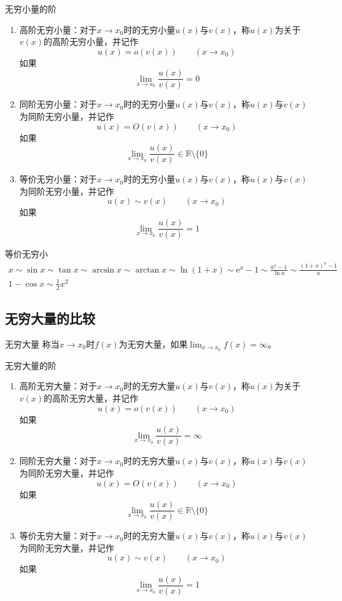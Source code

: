 \documentclass[lang = cn, scheme = chinese, thmcnt = section]{elegantbook}
\newcommand{\R}{\mathbb{R}}            %
\begin{document}
\begin{definition}{无穷小量的阶}
	\begin{enumerate}
		\item 高阶无穷小量：对于$x\to x_0$时的无穷小量$u(x)$与$v(x)$，称$u(x)$为关于$v(x)$的高阶无穷小量，并记作
		$$
		u(x)=o(v(x))\qquad (x\to x_0)
		$$
		如果
		$$
		\lim_{x\to x_0}\frac{u(x)}{v(x)}=0
		$$
		\item 同阶无穷小量：对于$x\to x_0$时的无穷小量$u(x)$与$v(x)$，称$u(x)$与$v(x)$为同阶无穷小量，并记作
		$$
		u(x)=O(v(x))\qquad (x\to x_0)
		$$
		如果
		$$
		\lim_{x\to x_0}\frac{u(x)}{v(x)}\in \R\setminus\{0\}
		$$
		\item 等价无穷小量：对于$x\to x_0$时的无穷小量$u(x)$与$v(x)$，称$u(x)$与$v(x)$为同阶无穷小量，并记作
		$$
		u(x)\sim v(x)\qquad (x\to x_0)
		$$
		如果
		$$
		\lim_{x\to x_0}\frac{u(x)}{v(x)}=1
		$$
	\end{enumerate}
\end{definition}

\begin{theorem}{等价无穷小}
	\begin{gather*}
		x\sim 
		\sin x \sim
		\tan x\sim
		\arcsin x\sim
		\arctan x\sim
		\ln(1+x)\sim
		\mathrm{e}^x-1\sim
		\frac{a^x-1}{\ln a}\sim
		\frac{(1+x)^a-1}{a}\\
		1-\cos x\sim\frac{1}{2}x^2		
	\end{gather*}
\end{theorem}

\subsection{无穷大量的比较}

\begin{definition}{无穷大量}
	称当$x\to x_0$时$f(x)$为无穷大量，如果$\displaystyle \lim_{x\to x_0}f(x)=\infty$。
\end{definition}

\begin{definition}{无穷大量的阶}
	\begin{enumerate}
		\item 高阶无穷大量：对于$x\to x_0$时的无穷大量$u(x)$与$v(x)$，称$u(x)$为关于$v(x)$的高阶无穷大量，并记作
		$$
		u(x)=o(v(x))\qquad (x\to x_0)
		$$
		如果
		$$
		\lim_{x\to x_0}\frac{u(x)}{v(x)}=\infty
		$$
		\item 同阶无穷大量：对于$x\to x_0$时的无穷大量$u(x)$与$v(x)$，称$u(x)$与$v(x)$为同阶无穷大量，并记作
		$$
		u(x)=O(v(x))\qquad (x\to x_0)
		$$
		如果
		$$
		\lim_{x\to x_0}\frac{u(x)}{v(x)}\in \R\setminus\{0\}
		$$
		\item 等价无穷大量：对于$x\to x_0$时的无穷大量$u(x)$与$v(x)$，称$u(x)$与$v(x)$为同阶无穷大量，并记作
		$$
		u(x)\sim v(x)\qquad (x\to x_0)
		$$
		如果
		$$
		\lim_{x\to x_0}\frac{u(x)}{v(x)}=1
		$$
	\end{enumerate}
\end{definition}
\end{document}
